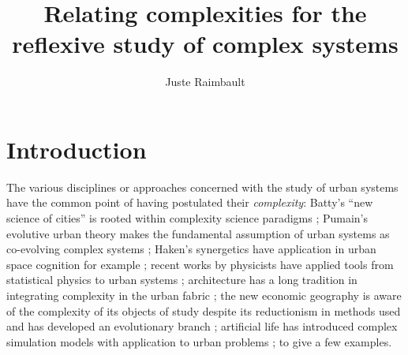 

\title*{Relating complexities for the reflexive study of complex systems}
\author{Juste Raimbault}
%
%
\maketitle










\section{Introduction}


The various disciplines or approaches concerned with the study of urban systems have the common point of having postulated their \emph{complexity}: Batty's ``new science of cities'' is rooted within complexity science paradigms \cite{batty2007cities,batty2013new}; Pumain's evolutive urban theory makes the fundamental assumption of urban systems as co-evolving complex systems \cite{pumain2017geography,pumain1997pour}; Haken's synergetics have application in urban space cognition for example \cite{e18060197}; recent works by physicists have applied tools from statistical physics to urban systems \cite{west2017scale}; architecture has a long tradition in integrating complexity in the urban fabric \cite{alexander1977pattern}; the new economic geography is aware of the complexity of its objects of study despite its reductionism in methods used \cite{krugman1994complex} and has developed an evolutionary branch \cite{cooke2018evolutionary}; artificial life has introduced complex simulation models with application to urban problems \cite{raimbault2014hybrid}; to give a few examples.

